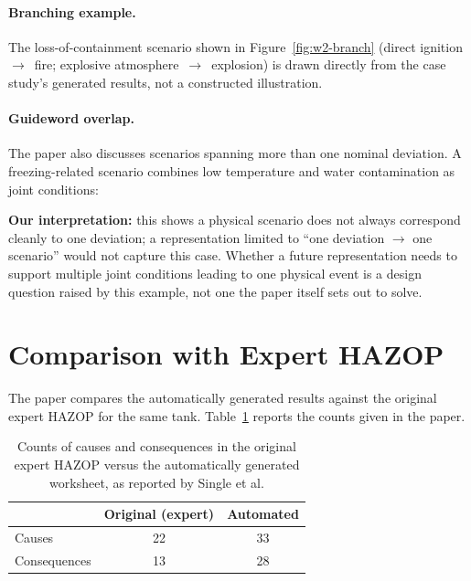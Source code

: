 \paragraph{Branching example.} The loss-of-containment scenario shown in Figure~\ref{fig:w2-branch} (direct ignition~$\rightarrow$~fire; explosive atmosphere~$\rightarrow$~explosion) is drawn directly from the case study's generated results, not a constructed illustration.

\paragraph{Guideword overlap.} The paper also discusses scenarios spanning more than one nominal deviation. A freezing-related scenario combines low temperature and water contamination as joint conditions:

\begin{center}
%
\end{center}

\textbf{Our interpretation:} this shows a physical scenario does not always correspond cleanly to one deviation; a representation limited to ``one deviation $\rightarrow$ one scenario'' would not capture this case. Whether a future representation needs to support multiple joint conditions leading to one physical event is a design question raised by this example, not one the paper itself sets out to solve.

\section{Comparison with Expert HAZOP}
The paper compares the automatically generated results against the original expert HAZOP for the same tank. Table~\ref{tab:w2-comparison} reports the counts given in the paper.

\begin{table}[htbp]
\centering
\caption[Causes and consequences: original vs.\ automated]{Counts of causes and consequences in the original expert HAZOP versus the automatically generated worksheet, as reported by Single et al.}
\label{tab:w2-comparison}
\begin{tabular}{@{}lcc@{}}
\toprule
 & \textbf{Original (expert)} & \textbf{Automated} \\
\midrule
Causes        & 22 & 33 \\
Consequences  & 13 & 28 \\
\bottomrule
\end{tabular}
\end{table}

